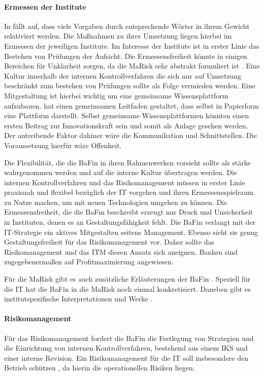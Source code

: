 \paragraph{Ermessen der Institute}
\label{ermessensfreiheit}
In \cite{MaRisk:2017, BAIT:2018} fällt auf, dass viele Vorgaben durch entsprechende Wörter in ihrem Gewicht relativiert werden. Die Maßnahmen zu ihrer Umsetzung liegen hierbei im Ermessen der jeweiligen Institute. Im Interesse der Institute ist in erster Linie das Bestehen von Prüfungen der Aufsicht. Die Ermessensfreiheit könnte in einigen Bereichen für Unklarheit sorgen, da die \ac{MaRisk} sehr abstrakt formuliert ist \cite{DSGV:2019}.
Eine Kultur innerhalb der internen Kontrollverfahren die sich nur auf Umsetzung beschränkt zum bestehen von Prüfungen sollte als Folge vermieden werden. Eine Mitgestaltung ist hierbei wichtig um eine gemeinsame Wissensplattform aufzubauen. \citet{DSGV:2019} hat einen gemeinsamen Leitfaden gestaltet, dass selbst in Papierform eine Plattform darstellt. Selbst gemeinsame Wissensplattformen könnten einen ersten Beitrag zur Innovationskraft sein und somit als Anlage gesehen werden. Der antreibende Faktor dahiner wäre die Kommunikation und Schnittstellen. Die Voraussetzung hierfür wäre Offenheit.

Die Flexibilität, die die \ac{BaFin} in ihren Rahmenwerken vorsieht \cite{MaRisk:2017} sollte als stärke wahrgenommen werden und auf die interne Kultur übertragen werden. Die internen Kontrollverfahren und das Risikomanagement müssen in erster Linie praxisnah und flexibel bezüglich der IT vorgehen und ihren Ermessensspielraum zu Nutze machen, um mit neuen Technologien umgehen zu können. Die Ermessensfreiheit, die die \ac{BaFin} beschreibt erzeugt nur Druck und Unsicherheit in Instituten, denen es an Gestaltungsfähigkeit fehlt. Die \ac{BaFin} verlangt mit der IT-Strategie \cite{BAIT:2018} ein aktives Mitgestalten seitens Management. Ebenso sieht sie genug Gestaltungsfreiheit für das Risikomanagement vor. Daher sollte das Risikomanagement und das \ac{ITM} diesen Ansatz sich aneignen. Banken sind zugegebenermaßen auf Profitmaximierung angewiesen. 

Für die \ac{MaRisk} gibt es auch zusätzliche Erläuterungen der BaFin \cite{MaRiskErläuterungen:2017}. Speziell für die IT hat die BaFin in \cite{BAIT:2018} die \ac{MaRisk} noch einmal konkretisiert. Daneben gibt es institutspezifische Interpretationen und Werke \cite{DSGV:2019}.

\paragraph{Risikomanagement}
Für das Risikomanagement fordert die \ac{BaFin} die Festlegung von Strategien und die Einrichtung von internen Kontrollverfahren, bestehend aus einem \ac{IKS} und einer interne Revision. Ein Risikomanagement für die IT soll insbesondere den Betrieb schützen \cite{MaRisk:2017}, da hierin die operationellen Risiken liegen. 

